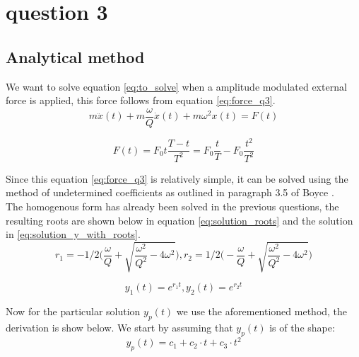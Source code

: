 \section{question 3}
\subsection{Analytical method}
We want to solve equation \ref{eq:to_solve} when a amplitude modulated external force is applied, this force follows from equation \ref{eq:force_q3}.\\

\begin{equation}
    m \ddot{x}(t)+m\frac{\omega}{Q}\dot{x}(t)+m \omega^2 x(t) = F(t)
    \label{eq:to_solve}
\end{equation}

\begin{equation}
    F(t) = F_0 t\frac{T-t}{T^2}= F_0 \frac{t}{T} - F_0 \frac{t^2}{T^2}
    \label{eq:force_q3}
\end{equation}

Since this equation \ref{eq:force_q3} is relatively simple, it can be solved using the method of undetermined coefficients as outlined in paragraph 3.5 of Boyce \cite{Boyce}.\\ The homogenous form has already been solved in the previous questions, the resulting roots are shown below in equation \ref{eq:solution_roots} and the solution in \ref{eq:solution_y_with_roots}.\\

\begin{equation}
    r_1 = -1/2 \biggl( \frac{\omega}{Q}+\sqrt{\frac{\omega^2}{Q^2}-4 \omega^2} \biggr), r_2 = 1/2 \biggl( -\frac{\omega}{Q}+\sqrt{\frac{\omega^2}{Q^2}-4 \omega^2} \biggr)
    \label{eq:solution_roots}
\end{equation}

\begin{equation}
    y_1(t) = e^{r_1 t},  y_2(t) = e^{r_2 t}
    \label{eq:solution_y_with_roots}
\end{equation}

Now for the particular solution $y_p(t)$ we use the aforementioned method, the derivation is show below. We start by assuming that $y_p(t)$ is of the shape:\\

\begin{equation*}
    y_p(t) = c_1 + c_2 \cdot t + c_3 \cdot t^2
\end{equation*}

